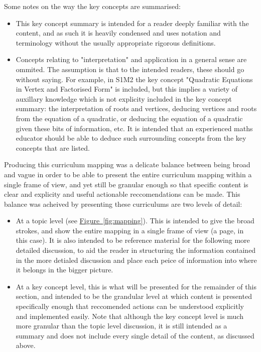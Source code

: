\documentclass[twoside,12pt,a4paper]{report}
\newcommand{\reffig}[1]{\hyperref[fig:#1]{Figure~\ref{fig:#1}}}
\begin{document}
Some notes on the way the key concepts are summarised:
\begin{itemize}
	\item This key concept summary is intended for a reader deeply familiar with the content, and as such it is heavily condensed and uses notation and terminology without the usually appropriate rigorous definitions. 
	\item Concepts relating to "interpretation" and application in a general sense are ommited. The assumption is that to the intended readers, these should go without saying. For example, in S1M2 the key concept "Quadratic Equations in Vertex and Factorised Form" is included, but this implies a variety of auxillary knowledge which is not explicity included in the key concept summary: the interpretation of roots and vertices, deducing vertices and roots from the equation of a quadratic, or deducing the equation of a quadratic given these bits of information, etc. It is intended that an experienced maths educator should be able to deduce such surrounding concepts from the key concepts that are listed. 
\end{itemize}

Producing this curriculum mapping was a delicate balance between being broad and vague in order to be able to present the entire curriculum mapping within a single frame of view, and yet still be granular enough so that specific content is clear and explicity and useful actionable reccomendations can be made. This balance was acheived by presenting these curriculums are two levels of detail: 
\begin{itemize}
	\item At a topic level (see \reffig{mapping}). This is intended to give the broad strokes, and show the entire mapping in a single frame of view (a page, in this case). It is also intended to be reference material for the following more detailed discussion, to aid the reader in structuring the information contained in the more detialed discussion and place each peice of information into where it belongs in the bigger picture.
	\item At a key concept level, this is what will be presented for the remainder of this section, and intended to be the grandular level at which content is presented specifically enough that reccomended actions can be understood explicitly and implemented easily. Note that although the key concept level is much more granular than the topic level discussion, it is still intended as a summary and does not include every single detail of the content, as discussed above.
\end{itemize}
\end{document}
